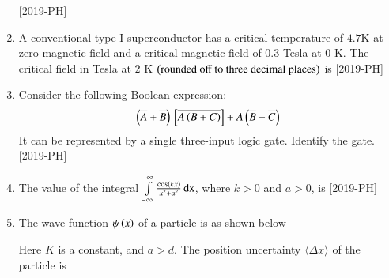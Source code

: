 \documentclass[journal]{IEEEtran}
\begin{document}
\begin{enumerate}[start=27]
    \hfill{[2019-PH]}\\
\item A conventional type-I superconductor has a critical temperature of $4.7$K at zero magnetic field and a critical magnetic field of $0.3$ Tesla at $0$ K. The critical field in Tesla at $2$ K
$\left(\text{rounded off to three decimal places}\right)$ is \underline{\hspace{1cm}} \hfill{[2019-PH]}\\
\item Consider the following Boolean expression:\\
\begin{align*}
    \left(\overline{A}+\overline{B}\right) {}\left[\overline{A \left(B+C\right)}\right] + A\left(\overline{B}+\overline{C}\right)
\end{align*}
It can be represented by a single three-input logic gate. Identify the gate. \hfill{[2019-PH]}\\
\begin{enumerate}
\end{enumerate}
\item The value of the integral $\int \limits_{-\infty}^{\infty} \frac{\cos \left(kx\right)}{x^2+a^2}\, \text{dx}$, where $k>0$ and $a>0$, is \hfill{[2019-PH]}\\
\begin{enumerate}
\end{enumerate}
\item The wave function $\psi\left(x\right)$ of a particle is as shown below\\
\begin{figure}[H]
			\centering
			
			\label{38}
		\end{figure}
Here $K$ is a constant, and $a>d$. The position uncertainty $\langle \Delta x \rangle$ of the particle is 


\end{enumerate}
\end{document}
